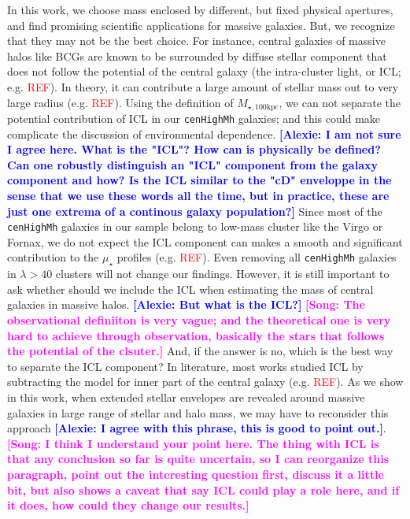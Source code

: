 \documentclass{emulateapj}
\def\rbcg{\texttt{cenHighMh}}
\def\mtot{{$M_{\star,100\mathrm{kpc}}$}}
\def\mden{{$\mu_{\star}$}}
\newcommand{\addref}{{\textcolor{red}{REF}}}
\newcommand{\song}[1]{\textcolor{magenta}{\textbf{[Song: #1]}}}
\newcommand{\alexie}[1]{\textcolor{blue}{\textbf{[Alexie: #1]}}}
\begin{document}
\begin{CJK*}{UTF8}{gbsn}
    In this work, we choose mass enclosed by different, but fixed physical 
    apertures, and find promising scientific applications for massive galaxies. 
    But, we recognize that they may not be the best choice. 
    For instance, central galaxies of massive halos like BCGs are known to be
    surrounded by diffuse stellar component that does not follow the potential 
    of the central galaxy (the intra-cluster light, or ICL; e.g. \addref{}).
    In theory, it can contribute a large amount of stellar mass out to very 
    large radius (e.g. \addref{}).  
    Using the definition of \mtot{}, we can not separate the potential 
    contribution of ICL in our \rbcg{} galaxies; and this could make complicate
    the discussion of environmental dependence.  \alexie{I am not sure I agree here. What is the "ICL"? How can is physically be defined? Can one robustly distinguish an "ICL" component from the galaxy component and how? Is the ICL similar to the "cD" enveloppe in the sense that we use these words all the time, but in practice, these are just one extrema of a continous galaxy population?}
    Since most of the \rbcg{} galaxies in our sample belong to low-mass cluster 
    like the Virgo or Fornax, we do not expect the ICL component can makes a 
    smooth and significant contribution to the \mden{} profiles (e.g. \addref{}).
    Even removing all \rbcg{} galaxies in $\lambda > 40$ clusters will not change 
    our findings.  
    However, it is still important to ask whether should we include the ICL when 
    estimating the mass of central galaxies in massive halos.  \alexie{But what is the ICL?}
    \song{The observational definiiton is very vague; and the theoretical one is 
    very hard to achieve through observation, basically the stars that follows the 
    potential of the clsuter.}
    And, if the answer is no, which is the best way to separate the ICL component? 
    In literature, most works studied ICL by subtracting the model for inner part
    of the central galaxy (e.g. \addref{}).  
    As we show in this work, when extended stellar envelopes are revealed around 
    massive galaxies in large range of stellar and halo mass, we may have to 
    reconsider this approach \alexie{I agree with this phrase, this is good to point out.}.
    \song{I think I understand your point here. The thing with ICL is that any 
    conclusion so far is quite uncertain, so I can reorganize this paragraph, 
    point out the interesting question first, discuss it a little bit, but also 
    shows a caveat that say ICL could play a role here, and if it does, how could 
    they change our results.}
 

\end{CJK*}
\end{document}
